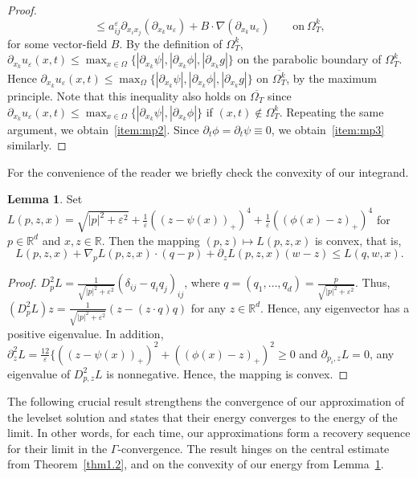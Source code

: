 \documentclass{amsart}
\theoremstyle{definition}
\newtheorem{lemma}[definition]{Lemma}
\def\R{{\mathbb{R}}}
\begin{document}
\begin{proof}
\[\leq 
a_{ij} ^\varepsilon \partial_{x_i x_j } (\partial_{x_k} u_\varepsilon)
+ B \cdot \nabla (\partial_{x_k} u_\varepsilon)
\qquad \text{on} \ \Omega_T ^k,
\]
for some vector-field $B$.
By the definition of $\Omega_T ^k$,
$ \partial_{x_k} u_\varepsilon (x,t)
\leq \max_{x \in \Omega}\{ |\partial _{x_k} \psi |, |\partial _{x_k} \phi |, |\partial _{x_k} g | \}$ on the parabolic boundary of $\Omega _T ^k$.
Hence $\partial _{x_k } u_\varepsilon (x,t)
\leq \max_{ \Omega}\{ |\partial _{x_k} \psi|, |\partial _{x_k} \phi|, |\partial _{x_k} g| \}$ on $\overline{\Omega_T ^k}$, by the maximum principle. Note that this inequality also holds on $\overline{\Omega_T }$
since $\partial _{x_k} u_\varepsilon (x,t) \leq \max_{x \in \Omega} \{ |\partial_{x_k} \psi |, |\partial_{x_k} \phi |\}$ if $(x,t) \not \in \Omega_T ^k$.
Repeating the same argument, we obtain~\eqref{item:mp2}.
Since $\partial_t \phi =\partial _t \psi \equiv 0$, we obtain~\eqref{item:mp3} similarly.
\end{proof}

For the convenience of the reader we briefly check the convexity of our integrand.
\begin{lemma}\label{lemma:convexity}
Set $L(p,z,x) = \sqrt{|p|^2 +\varepsilon^2} + 
\frac{1}{\varepsilon} ((z-\psi (x))_+)^4
+ 
\frac{1}{\varepsilon} ((\phi (x) -z)_+)^4
$ for $p \in \R^d$ and $x,z \in \R$.
Then the mapping $(p,z) \mapsto L(p,z,x)$ is convex, that is,
\[
L(p,z,x) + \nabla _p L (p,z,x) \cdot (q-p)
+ \partial_z L (p,z,x) (w-z) \leq L (q,w,x).
\]
\end{lemma}
\begin{proof}
    $D^2 _p L= \frac{1}{\sqrt{|p|^2 +\varepsilon^2}}( \delta_{ij} - q_i q_j )_{ij} $, where $q=(q_1,\dots,q_d)=\frac{p}{\sqrt{|p|^2+\varepsilon^2}}$.
    Thus, $(D^2 _p L) z = \frac{1}{\sqrt{|p|^2 +\varepsilon^2}} (z - (z\cdot q)q)$ for any $z \in \R^d$. Hence, any eigenvector has a positive eigenvalue. In addition, 
    $\partial _z ^2 L= \frac{12}{\varepsilon}
    \{ ((z-\psi (x))_+)^2+ 
    ((\phi (x) -z)_+)^2 \geq 0
    $ and $\partial_{p_i, z} L= 0$, any eigenvalue of $D^2 _{p,z} L$ is nonnegative.
    Hence, the mapping is convex.
\end{proof}

The following crucial result strengthens the convergence of our approximation of the levelset solution and states that their energy converges to the energy of the limit. In other words, for each time, our approximations form a recovery sequence for their limit in the $\Gamma$-convergence.
The result hinges on the central estimate from Theorem~\ref{thm1.2}, and on the convexity of our energy from Lemma~\ref{lemma:convexity}.
\end{document}
